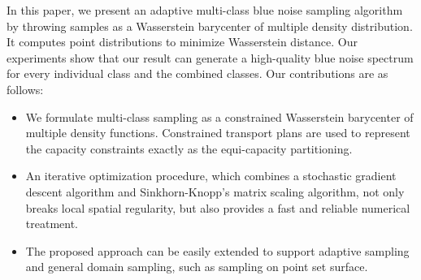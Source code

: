 In this paper, we present an adaptive multi-class blue noise sampling algorithm by
throwing samples as a Wasserstein barycenter of multiple density distribution.
It computes point distributions to minimize Wasserstein distance.
Our experiments show that our result can generate a high-quality blue noise spectrum for every individual class and the combined classes.
Our contributions are as follows:
\begin{itemize}
\item We formulate multi-class sampling as a constrained Wasserstein barycenter of multiple density functions.
Constrained transport plans  are used to represent the capacity constraints exactly as the equi-capacity partitioning.
\item An iterative optimization procedure,
which combines a stochastic gradient descent algorithm and Sinkhorn-Knopp's matrix scaling algorithm,
not only breaks local spatial regularity, but also provides a fast and reliable numerical treatment.
\item The proposed approach can be easily extended to support adaptive sampling and general domain sampling,
such as sampling on point set surface.
\end{itemize}
